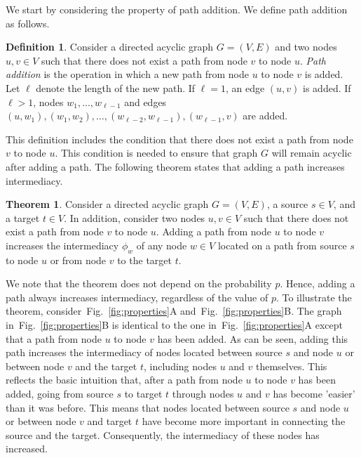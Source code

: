 \documentclass[9pt,twocolumn,twoside,lineno]{pnas-alt}
\theoremstyle{definition}
\newtheorem{definition}{Definition}
\newtheorem{theorem}{Theorem}
\newcommand{\subfigref}[2]{Fig.~\ref{fig:#1}#2\xspace}
\begin{document}
We start by considering the property of path addition. We define path addition as follows.

\begin{definition}
    Consider a directed acyclic graph $G = (V, E)$ and two nodes $u, v \in V$ such that there does not exist a path from node $v$ to node $u$. \emph{Path addition} is the operation in which a new path from node $u$ to node $v$ is added. Let $\ell$ denote the length of the new path. If $\ell = 1$, an edge $(u, v)$ is added. If $\ell > 1$, nodes $w_1, \ldots, w_{\ell - 1}$ and edges $(u, w_1), (w_1, w_2), \ldots, (w_{\ell - 2}, w_{\ell - 1}), (w_{\ell - 1}, v)$ are added.
\end{definition}

This definition includes the condition that there does not exist a path from node $v$ to node $u$. This condition is needed to ensure that graph $G$ will remain acyclic after adding a path. The following theorem states that adding a path increases intermediacy.

\begin{theorem}
    Consider a directed acyclic graph $G = (V, E)$, a source $s \in V$, and a target $t \in V$. In addition, consider two nodes $u, v \in V$ such that there does not exist a path from node $v$ to node $u$. Adding a path from node $u$ to node $v$ increases the intermediacy $\phi_w$ of any node $w \in V$ located on a path from source $s$ to node $u$ or from node $v$ to the target $t$.
    \label{the:add}
\end{theorem}

We note that the theorem does not depend on the probability $p$. Hence, adding a path always increases intermediacy, regardless of the value of $p$. To illustrate the theorem, consider~\subfigref{properties}{A} and~\subfigref{properties}{B}. The graph in~\subfigref{properties}{B} is identical to the one in~\subfigref{properties}{A} except that a path from node $u$ to node $v$ has been added. As can be seen, adding this path increases the intermediacy of nodes located between source $s$ and node $u$ or between node $v$ and the target $t$, including nodes $u$ and $v$ themselves. This reflects the basic intuition that, after a path from node $u$ to node $v$ has been added, going from source $s$ to target $t$ through nodes $u$ and $v$ has become 'easier' than it was before. This means that nodes located between source $s$ and node $u$ or between node $v$ and target $t$ have become more important in connecting the source and the target. Consequently, the intermediacy of these nodes has increased.
\end{document}
